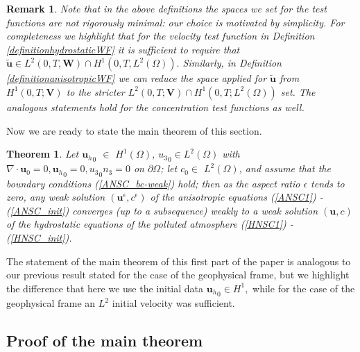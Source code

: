\documentclass[11pt, a4paper]{article}
\newtheorem{theorem}{Theorem}
\newtheorem{remark}{Remark}
\begin{document}
\begin{remark}
Note that in the above definitions the spaces we set for the test functions are not rigorously minimal: our choice is motivated by simplicity. For completeness we highlight that for the velocity test function in Definition \ref{definitionhydrostaticWF} it is sufficient to require that $\mathbf{\tilde{u}} \in L^2 (0,T, \mathbf{W}) \cap H^1(0,T, L^2(\Omega)).$ Similarly, in Definition \ref{definitionanisotropicWF} we can reduce the space applied for $\mathbf{\tilde{u}}$ from $H^1 (0,T;\mathbf{V})$ to the stricter $L^2 (0,T;\mathbf{V}) \cap H^1 (0,T; L^2(\Omega))$ set. The analogous statements hold for the concentration test functions as well.
\end{remark}

Now we are ready to state the main theorem of this section.

\begin{theorem} \label{maintheoremWEAK}
Let ${\mathbf{u}_h}_0$ $\in$ $H^1 (\Omega)$, ${u_3}_0 \in L^2(\Omega)$ with $\nabla \cdot \mathbf{u}_0 = 0, {\mathbf{u}_h}_0 = 0, {u_3}_0 n_3 = 0$ on $\partial \Omega$; let $c_0 \in$ $L^2 (\Omega)$, and assume that the boundary conditions (\ref{ANSC_bc-weak}) hold; then as the aspect ratio $\epsilon$ tends to zero, any weak solution $(\mathbf{u}^\epsilon, c^\epsilon)$ of the anisotropic equations (\ref{ANSC1}) - (\ref{ANSC_init}) converges (up to a subsequence) weakly to a weak solution $(\mathbf{u}, c)$ of the hydrostatic equations of the polluted atmosphere (\ref{HNSC1}) - (\ref{HNSC_init}).
\end{theorem}

The statement of the main theorem of this first part of the paper is analogous to our previous result stated for the case of the geophysical frame, but we highlight the difference that here we use the initial data ${\mathbf{u}_h}_0 \in H^1,$ while for the case of the geophysical frame an $L^2$ initial velocity was sufficient.

\subsection{Proof of the main theorem} \label{proof}
\end{document}
